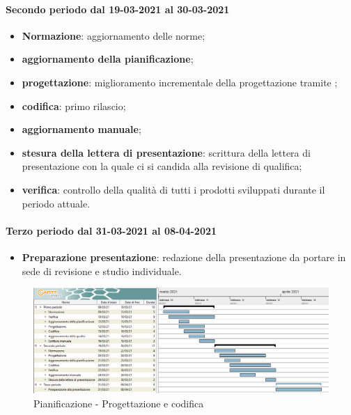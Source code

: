 \paragraph{Secondo periodo dal 19-03-2021 al 30-03-2021} 
\begin{itemize} 
	\item \textbf{Normazione}: aggiornamento delle norme; 
	\item \textbf{aggiornamento della pianificazione}; 
	\item \textbf{progettazione}: miglioramento incrementale della progettazione tramite ; 
	\item \textbf{codifica}: primo rilascio; 
	\item \textbf{aggiornamento manuale}; 
	\item \textbf{stesura della lettera di presentazione}: scrittura della lettera di presentazione con la quale ci 
	si candida alla revisione di qualifica; 
	\item \textbf{verifica}: controllo della qualità di tutti i prodotti sviluppati durante il periodo attuale. 
\end{itemize} 

\paragraph{Terzo periodo dal 31-03-2021 al 08-04-2021} 
\begin{itemize} 
	\item \textbf{Preparazione presentazione}: redazione della presentazione da portare in sede di revisione e 
	studio individuale. 
\end{itemize} 

\newpage 

\begin{landscape} 
	\begin{figure}[h!] 
		\includegraphics[width=24cm]{images/4_Progettazione_e_codifica.png} 
		\caption{Pianificazione - Progettazione e codifica} 
	\end{figure} 
\end{landscape} 

